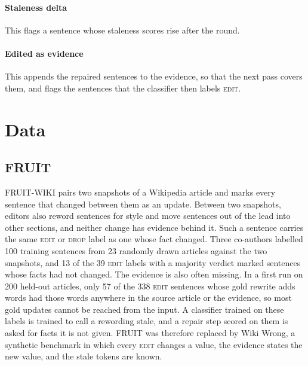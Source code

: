 \documentclass[11pt]{article}
\newcommand{\edit}{\textsc{edit}}
\newcommand{\drop}{\textsc{drop}}
\begin{document}
\paragraph{Staleness delta}
This flags a sentence whose staleness scores rise after the round.

\paragraph{Edited as evidence}
This appends the repaired sentences to the evidence, so that the next pass covers them, and flags the sentences that the classifier then labels \edit{}.



\section{Data}
\label{sec:data}

\subsection{FRUIT}
\label{sec:fruit}
FRUIT-WIKI \citep{iv-etal-2022-fruit} pairs two snapshots of a Wikipedia article and marks every sentence that changed between them as an update. Between two snapshots, editors also reword sentences for style and move sentences out of the lead into other sections, and neither change has evidence behind it. Such a sentence carries the same \edit{} or \drop{} label as one whose fact changed. Three co-authors labelled 100 training sentences from 23 randomly drawn articles against the two snapshots, and 13 of the 39 \edit{} labels with a majority verdict marked sentences whose facts had not changed. The evidence is also often missing. In a first run on 200 held-out articles, only 57 of the 338 \edit{} sentences whose gold rewrite adds words had those words anywhere in the source article or the evidence, so most gold updates cannot be reached from the input. A classifier trained on these labels is trained to call a rewording stale, and a repair step scored on them is asked for facts it is not given. FRUIT was therefore replaced by Wiki Wrong, a synthetic benchmark in which every \edit{} changes a value, the evidence states the new value, and the stale tokens are known.
\end{document}
